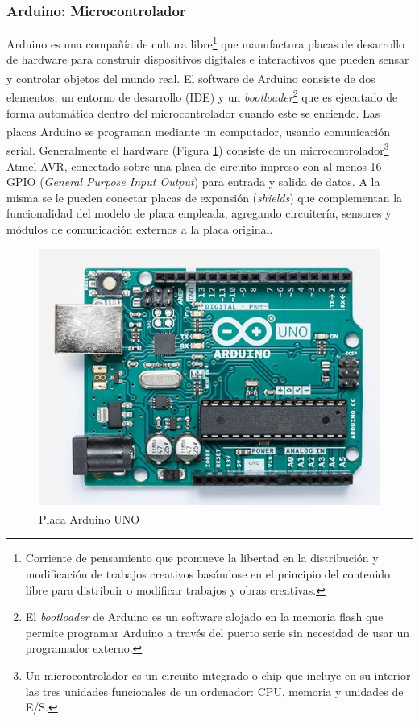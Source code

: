         \subsubsection{Arduino: Microcontrolador}
        
            \par Arduino\textsuperscript{\textregistered} es una compañía de cultura libre\footnote{Corriente de pensamiento que promueve la libertad en la distribución y modificación de trabajos creativos basándose en el principio del contenido libre para distribuir o modificar trabajos y obras creativas.} que manufactura placas de desarrollo de hardware para construir dispositivos digitales e interactivos que pueden sensar y controlar objetos del mundo real. El software de Arduino\textsuperscript{\textregistered} consiste de dos elementos, un entorno de desarrollo (IDE) y un \textit{bootloader}\footnote{El \textit{bootloader} de Arduino es un software alojado en la memoria flash que permite programar Arduino a través del puerto serie sin necesidad de usar un programador externo.} que es ejecutado de forma automática dentro del microcontrolador cuando este se enciende. Las placas Arduino\textsuperscript{\textregistered} se programan mediante un computador, usando comunicación serial. Generalmente el hardware (Figura \ref{boardArduino}) consiste de un microcontrolador\footnote{Un microcontrolador es un circuito integrado o chip que incluye en su interior las tres unidades funcionales de un ordenador: CPU, memoria y unidades de E/S.} Atmel AVR, conectado sobre una placa de circuito impreso con al menos 16 GPIO (\textit{General Purpose Input Output}) para entrada y salida de datos. A la misma se le pueden conectar placas de expansión (\textit{shields}) que complementan la funcionalidad del modelo de placa empleada, agregando circuitería, sensores y módulos de comunicación externos a la placa original.
        
            \begin{figure}[h]
                \centering
                \includegraphics[scale=0.6]{hardware/Arduino.jpg}
                \caption{Placa Arduino\textsuperscript{\textregistered} UNO}
                \label{boardArduino}
            \end{figure}
        
